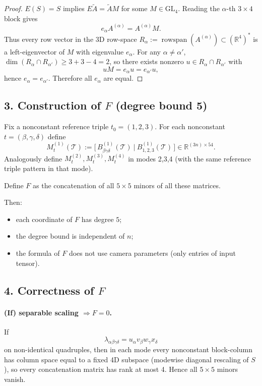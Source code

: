 \begin{proof}
$E(S)=S$ implies $E\widetilde A=\widetilde A M$ for some $M\in\mathrm{GL}_4$.
Reading the $\alpha$-th $3\times4$ block gives
\[
e_\alpha A^{(\alpha)}=A^{(\alpha)}M.
\]
Thus every row vector in the 3D row-space $R_\alpha:=\operatorname{rowspan}(A^{(\alpha)})\subset(\mathbb R^4)^*$ is a left-eigenvector of $M$ with eigenvalue $e_\alpha$.
For any $\alpha\neq\alpha'$, $\dim(R_\alpha\cap R_{\alpha'})\ge 3+3-4=2$, so there exists nonzero $u\in R_\alpha\cap R_{\alpha'}$ with
\[
uM=e_\alpha u=e_{\alpha'}u,
\]
hence $e_\alpha=e_{\alpha'}$. Therefore all $e_\alpha$ are equal.
\end{proof}

\subsection*{3. Construction of $F$ (degree bound 5)}

Fix a nonconstant reference triple $t_0=(1,2,3)$.
For each nonconstant $t=(\beta,\gamma,\delta)$ define
\[
M^{(1)}_t(\mathcal T):=\big[\,B^{(1)}_{\beta\gamma\delta}(\mathcal T)\ \big|\ B^{(1)}_{1,2,3}(\mathcal T)\,\big]\in\mathbb R^{(3n)\times 54}.
\]
Analogously define $M^{(2)}_t,M^{(3)}_t,M^{(4)}_t$ in modes 2,3,4 (with the same reference triple pattern in that mode).

Define $F$ as the concatenation of all $5\times5$ minors of all these matrices.

Then:
\begin{itemize}
\item each coordinate of $F$ has degree $5$;
\item the degree bound is independent of $n$;
\item the formula of $F$ does not use camera parameters (only entries of input tensor).
\end{itemize}

\subsection*{4. Correctness of $F$}

\paragraph{(If) separable scaling $\Rightarrow F=0$.}
If
\[
\lambda_{\alpha\beta\gamma\delta}=u_\alpha v_\beta w_\gamma x_\delta
\]
on non-identical quadruples, then in each mode every nonconstant block-column has column space equal to a fixed 4D subspace (modewise diagonal rescaling of $S$), so every concatenation matrix has rank at most 4. Hence all $5\times5$ minors vanish.

